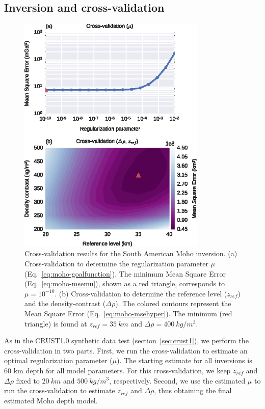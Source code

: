 \subsection{Inversion and cross-validation}

\begin{figure}
    \centering
    \includegraphics[width=0.8\textwidth]{figures/paper-moho/south-america-cv}
    \caption{
        Cross-validation results for the South American Moho inversion.
        (a) Cross-validation to determine the regularization parameter $\mu$
        (Eq.~\ref{eq:moho-goalfunction}).
        The minimum Mean Square Error (Eq.~\ref{eq:moho-msemu}),
        shown as a red triangle,
        corresponds to $\mu = 10^{-10}$.
        (b) Cross-validation to determine
        the reference level ($z_{ref}$) and the density-contrast ($\Delta\rho$).
        The colored contours represent
        the Mean Square Error (Eq.~\ref{eq:moho-msehyper}).
        The minimum (red triangle) is found at $z_{ref} = 35\ km$
        and $\Delta\rho = 400\ kg/m^3$.
    }
    \label{fig:moho-sam-cv}
\end{figure}



As in the CRUST1.0 synthetic data test (section~\ref{sec:crust1}),
we perform the cross-validation in two parts.
First, we run the cross-validation to estimate
an optimal regularization parameter ($\mu$).
The starting estimate for all inversions is
60 km depth for all model parameters.
For this cross-validation,
we keep $z_{ref}$ and $\Delta\rho$ fixed to
$20\ km$ and $500\ kg/m^3$, respectively.
Second, we use the estimated $\mu$ to run the cross-validation
to estimate $z_{ref}$ and $\Delta\rho$,
thus obtaining the final estimated Moho depth model.

